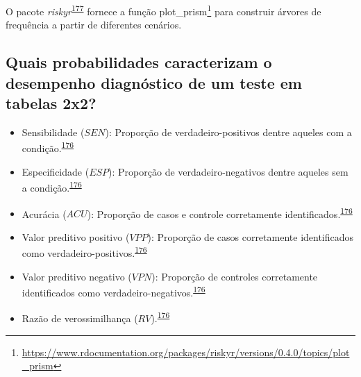 \documentclass[
  a4paper,
]{book}
\renewcommand{\href}[2]{#2\footnote{\url{#1}}}
\newenvironment{infobox}[1]
  {
  \begin{itemize}
  \renewcommand{\labelitemi}{
    \raisebox{-.7\height}[0pt][0pt]{
      {\setkeys{Gin}{width=3em,keepaspectratio}
        \texttt{[image: \#1]}}
    }
  }
  \setlength{\fboxsep}{1em}
  \begin{blackbox}
  \item
  }
  {
  \end{blackbox}
  \end{itemize}
  }
\begin{document}
\begin{infobox}{images/Rlogo}
O pacote \emph{riskyr}\textsuperscript{\protect\hyperlink{ref-riskyr}{177}} fornece a função \href{https://www.rdocumentation.org/packages/riskyr/versions/0.4.0/topics/plot_prism}{plot\_prism} para construir árvores de frequência a partir de diferentes cenários.

\end{infobox}

\hypertarget{quais-probabilidades-caracterizam-o-desempenho-diagnuxf3stico-de-um-teste-em-tabelas-2x2}{%
\subsection{Quais probabilidades caracterizam o desempenho diagnóstico de um teste em tabelas 2x2?}\label{quais-probabilidades-caracterizam-o-desempenho-diagnuxf3stico-de-um-teste-em-tabelas-2x2}}

\begin{itemize}
\item
  Sensibilidade (\(SEN\)): Proporção de verdadeiro-positivos dentre aqueles com a condição.\textsuperscript{\protect\hyperlink{ref-greenhalgh1997b}{176}}
\item
  Especificidade (\(ESP\)): Proporção de verdadeiro-negativos dentre aqueles sem a condição.\textsuperscript{\protect\hyperlink{ref-greenhalgh1997b}{176}}
\item
  Acurácia (\(ACU\)): Proporção de casos e controle corretamente identificados.\textsuperscript{\protect\hyperlink{ref-greenhalgh1997b}{176}}
\item
  Valor preditivo positivo (\(VPP\)): Proporção de casos corretamente identificados como verdadeiro-positivos.\textsuperscript{\protect\hyperlink{ref-greenhalgh1997b}{176}}
\item
  Valor preditivo negativo (\(VPN\)): Proporção de controles corretamente identificados como verdadeiro-negativos.\textsuperscript{\protect\hyperlink{ref-greenhalgh1997b}{176}}
\item
  Razão de verossimilhança (\(RV\)).\textsuperscript{\protect\hyperlink{ref-greenhalgh1997b}{176}}
\end{itemize}
\end{document}

